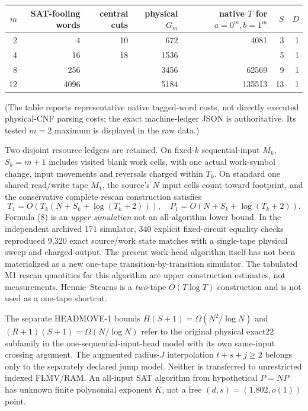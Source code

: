 \documentclass[11pt]{article}
\begin{document}
\begin{center}\small
\begin{tabular}{rrrrrrr}\toprule
$m$& SAT-fooling words & central cuts & physical $G_m$ & native $T$ for $a=0^m,b=1^m$ & $S$&$D$\\\midrule
2&4&10&672&4081&3&1\\
4&16&18&1536& &5&1\\
8&256& &3456&62569&9&1\\
12&4096& &5184&135513&13&1\\\bottomrule
\end{tabular}
\end{center}
(The table reports representative native tagged-word costs, not directly executed physical-CNF parsing costs; the exact machine-ledger JSON is authoritative. Its tested $m=2$ maximum is displayed in the raw data.)

Two disjoint resource ledgers are retained. On fixed-$k$ sequential-input $M_k$, $S_k=m+1$ includes visited blank work cells, with one actual work-symbol change, input movements and reversals charged within $T_k$. On standard one shared read/write tape $M_1$, the source's $N$ input cells count toward footprint, and the conservative complete rescan construction satisfies
\[
 T_1=O(T_k(N+S_k+\log(T_k+2))),\quad
 P_1=O(N+S_k+\log(T_k+2)).                             \tag{8}
\]
Formula (8) is an \emph{upper simulation} not an all-algorithm lower bound. In the independent archived 171 simulator, 340 explicit fixed-circuit equality checks reproduced 9,320 exact source/work state matches with a single-tape physical sweep and charged output. The present work-head algorithm itself has not been materialized as a new one-tape transition-by-transition simulator. The tabulated M1 rescan quantities for this algorithm are upper construction estimates, not measurements. Hennie--Stearns is a \emph{two}-tape $O(T\log T)$ construction and is not used as a one-tape shortcut.

The separate HEADMOVE-1 bounds $H(S+1)=\Omega(N^2/\log N)$ and $(R+1)(S+1)=\Omega(N/\log N)$ refer to the original physical exact22 subfamily in the one-sequential-input-head model with its own same-input crossing argument. The augmented radius-$J$ interpolation $t+s+j\ge2$ belongs only to the separately declared jump model. Neither is transferred to unrestricted indexed FLMV/RAM. An all-input SAT algorithm from hypothetical $P=NP$ has unknown finite polynomial exponent $K$, not a free $(d,s)=(1.802,o(1))$ point.
\end{document}
